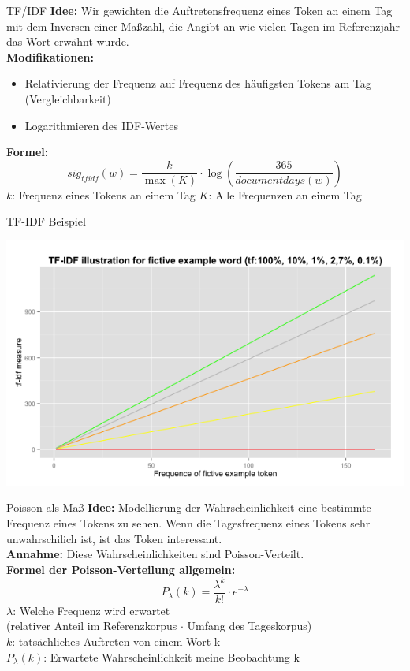 \documentclass{beamer}
\begin{document}
\begin{frame}{TF/IDF}
 	\textbf{Idee: } Wir gewichten die Auftretensfrequenz eines Token an einem Tag mit dem Inversen einer Maßzahl, die Angibt an wie vielen Tagen im Referenzjahr das Wort erw\"ahnt wurde.\\
	\textbf{Modifikationen: } 
	\begin{itemize}
		\item{Relativierung der Frequenz auf Frequenz des h\"aufigsten Tokens am Tag (Vergleichbarkeit)}
		\item{Logarithmieren des IDF-Wertes}
	\end{itemize}
	\textbf{Formel:}
	 \begin{equation}
		sig_{tf idf}(w) = \frac{k}{\max(K)} \cdot \log ( \frac{365}{documentdays(w)})
	\end{equation}
	$k$: Frequenz eines Tokens an einem Tag
	$K$: Alle Frequenzen an einem Tag
\end{frame}

\begin{frame}{TF-IDF Beispiel}
	\hspace{1cm}
	  \begin{centering}
	  \includegraphics[width=1\textwidth]{pictures/tfidfIllustration.png}
	\end{centering}
\end{frame}


\begin{frame}{Poisson als Ma\ss}
	\textbf{Idee: } Modellierung der Wahrscheinlichkeit eine bestimmte Frequenz eines Tokens zu sehen. Wenn die Tagesfrequenz eines Tokens sehr unwahrschilich ist, ist das Token interessant.\\
	\textbf{Annahme: } Diese Wahrscheinlichkeiten sind Poisson-Verteilt.\\
	\textbf{Formel der Poisson-Verteilung allgemein: }
	\begin{equation}
	P_\lambda(k) = \frac{\lambda^{k}}{k!}  \cdot e^{-\lambda}
	\end{equation}
	$\lambda$: Welche Frequenz wird erwartet \\
	(relativer Anteil im Referenzkorpus $\cdot$ Umfang des Tageskorpus)\\
	$k$: tats\"achliches Auftreten von einem Wort k\\
	$P_\lambda(k)$: Erwartete Wahrscheinlichkeit meine Beobachtung k
\end{frame}
\end{document}
